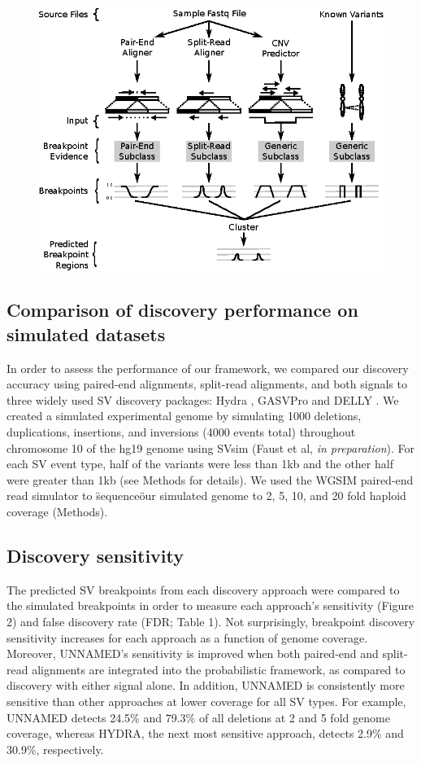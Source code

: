 \documentclass[11pt]{article}
\begin{document}
\begin{figure}
\includegraphics{Workflow.eps}
\end{figure}

\subsection{Comparison of discovery performance on simulated datasets}
In order to assess the performance of our framework, we compared our discovery
accuracy using paired-end alignments, split-read alignments, and both signals to 
three widely used SV discovery packages: Hydra \cite{Quinlan2010},
GASVPro \cite{Sindi2012} and DELLY \cite{Rausch2012b}. We created a simulated 
experimental genome by simulating 1000 deletions, duplications, insertions, 
and inversions (4000 events total) throughout chromosome 10 of the hg19 genome 
using SVsim (Faust et al, \emph{in preparation}).  For each SV event type, half
of the variants were less than 1kb and the other half were greater than 1kb (see
Methods for details).  We used the WGSIM \cite{Li2008} paired-end read 
simulator to \"sequence\" our simulated genome to 2, 5, 10, and 20 fold 
haploid coverage (Methods).

\subsection{Discovery sensitivity}
The predicted SV breakpoints from each discovery approach were compared to the
simulated breakpoints in order to measure each approach's sensitivity (Figure 2) 
and false discovery rate (FDR; Table 1). Not surprisingly, breakpoint discovery
sensitivity increases for each approach as a function of genome coverage.
Moreover, UNNAMED's sensitivity is improved when both paired-end and split-read
alignments are integrated into the probabilistic framework, as compared to 
discovery with either signal alone. In addition, UNNAMED is consistently more
sensitive than other approaches at lower coverage for all SV types. For example,
UNNAMED detects 24.5\% and 79.3\% of all deletions at 2 and 5 fold genome
coverage, whereas HYDRA, the next most sensitive approach, detects 2.9\% and
30.9\%, respectively. 
\end{document}
